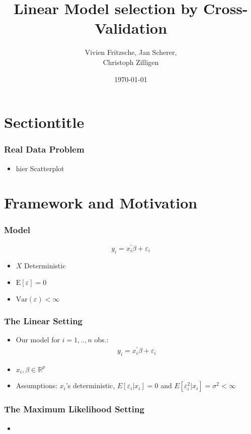 \documentclass[20pt]{beamer}
\title[Cross Validation]{ Linear Model selection by Cross-Validation}
\author{ Vivien Fritzsche, Jan Scherer, \\ Christoph Zilligen}
\date{\today}
\newcommand{\E}{\mathrm{E}}
\newcommand{\Var}{\mathrm{Var}}
\begin{document}
\beamertemplatenavigationsymbolsempty
\begin{frame}
\titlepage
\end{frame}

\section{Sectiontitle}

\begin{frame}
	\frametitle{Real Data Problem}
	\begin{itemize}
		\item hier Scatterplot
	\end{itemize}
\end{frame}

\section{Framework and Motivation}

\begin{frame}
\frametitle{Model}
\[
y_i=x_i^\prime\beta+\varepsilon_i
\]
\begin{itemize}
	\item $X$ Deterministic
	\item $\E[\varepsilon]=0$
	\item $\Var(\varepsilon)<\infty$
\end{itemize}
\end{frame}

\begin{frame}
\frametitle{The Linear Setting}
\begin{itemize}
	\item Our model for $i=1,..,n$ obs.:
	\begin{align*}
		y_i=x_i^\prime\beta+\varepsilon_i
	\end{align*}
	\item $x_i,\beta\in\mathbb{R}^p$
	\item Assumptions:
	$x_i$'s deterministic,
	$E[\varepsilon_i|x_i]=0$ and $E[\varepsilon_i^2|x_i]=\sigma^2<\infty$
\end{itemize}
\end{frame}



\begin{frame}
	\frametitle{The Maximum Likelihood Setting}
	\begin{itemize}
		\item 
	\end{itemize}
\end{frame}
\end{document}
